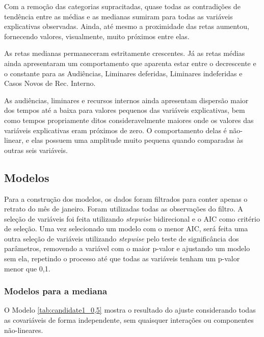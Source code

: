 Com a remoção das categorias supracitadas, quase todas as contradições de tendência entre as médias e as medianas sumiram para todas as variáveis explicativas observadas. Ainda, até mesmo a proximidade das retas aumentou, fornecendo valores, visualmente, muito próximos entre elas.

As retas medianas permaneceram estritamente crescentes. Já as retas médias ainda apresentaram um comportamento que aparenta estar entre o decrescente e o constante para as Audiências, Liminares deferidas, Liminares indeferidas e Casos Novos de Rec. Interno.

As audiências, liminares e recursos internos ainda apresentam dispersão maior dos tempos até a baixa para valores pequenos das variáveis explicativas, bem como tempos propriamente ditos consideravelmente maiores onde os valores das variáveis explicativas eram próximos de zero. O comportamento delas é não-linear, e elas possuem uma amplitude muito pequena quando comparadas às outras seis variáveis.





\newpage
\subsection{Modelos}

Para a construção dos modelos, os dados foram filtrados para conter apenas o retrato do mês de janeiro. Foram utilizadas todas as observações do filtro. A seleção de variáveis foi feita utilizando \textit{stepwise} bidirecional e o AIC como critério de seleção. Uma vez selecionado um modelo com o menor AIC, será feita uma outra seleção de variáveis utilizando \textit{stepwise} pelo teste de significância dos parâmetros, removendo a variável com o maior p-valor e ajustando um modelo sem ela, repetindo o processo até que todas as variáveis tenham um p-valor menor que 0,1.

\subsubsection{Modelos para a mediana}
\label{modelos_mediana}
O Modelo \ref{tab:candidate1_0,5} mostra o resultado do ajuste considerando todas as covariáveis de forma independente, sem quaisquer interações ou componentes não-lineares.


